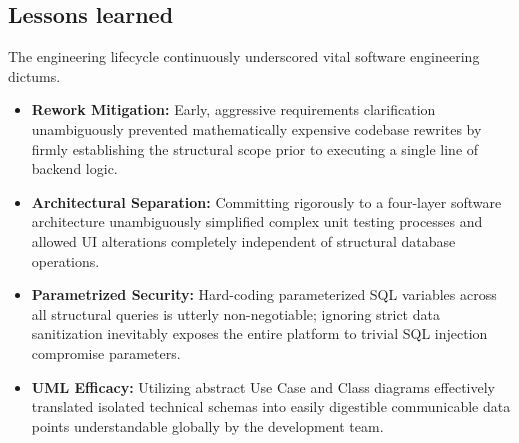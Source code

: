 \subsection{Lessons learned}
The engineering lifecycle continuously underscored vital software engineering dictums.
\begin{itemize}
    \item \textbf{Rework Mitigation:} Early, aggressive requirements clarification unambiguously prevented mathematically expensive codebase rewrites by firmly establishing the structural scope prior to executing a single line of backend logic.
    \item \textbf{Architectural Separation:} Committing rigorously to a four-layer software architecture unambiguously simplified complex unit testing processes and allowed UI alterations completely independent of structural database operations.
    \item \textbf{Parametrized Security:} Hard-coding parameterized SQL variables across all structural queries is utterly non-negotiable; ignoring strict data sanitization inevitably exposes the entire platform to trivial SQL injection compromise parameters.
    \item \textbf{UML Efficacy:} Utilizing abstract Use Case and Class diagrams effectively translated isolated technical schemas into easily digestible communicable data points understandable globally by the development team.
\end{itemize}

